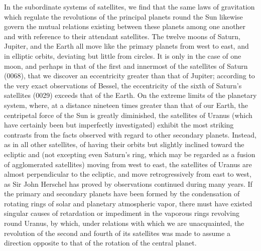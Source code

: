 In the subordinate systems of satellites, we find that the same laws of gravitation which regulate the revolutions of the principal planets round the Sun likewise govern the mutual relations existing between these planets among one another and with reference to their attendant satellites. The twelve moons of Saturn, Jupiter, and the Earth all move like the primary planets from west to east, and in elliptic orbits, deviating but little from circles. It is only in the case of one moon, and perhaps in that of the first and innermost of the satellites of Saturn (0068), that we discover an eccentricity greater than that of Jupiter; according to the very exact observations of Bessel, the eccentricity of the sixth of Saturn's satellites (0029) exceeds that of the Earth. On the extreme limits of the planetary system, where, at a distance nineteen times greater than that of our Earth, the centripetal force of the Sun is greatly diminished, the satellites of Uranus (which have certainly been but imperfectly investigated) exhibit the most striking contrasts from the facts observed with regard to other secondary planets. Instead, as in all other satellites, of having their orbits but slightly inclined toward the ecliptic and (not excepting even Saturn's ring, which may be regarded as a fusion of agglomerated satellites) moving from west to east, the satellites of Uranus are almost perpendicular to the ecliptic, and move retrogressively from east to west, as Sir John Herschel has proved by observations continued during many years. If the primary and secondary planets have been formed by the condensation of rotating rings of solar and planetary atmospheric vapor, there must have existed singular causes of retardation or impediment in the vaporous rings revolving round Uranus, by which, under relations with which we are unacquainted, the revolution of the second and fourth of its satellites was made to assume a direction opposite to that of the rotation of the central planet.
